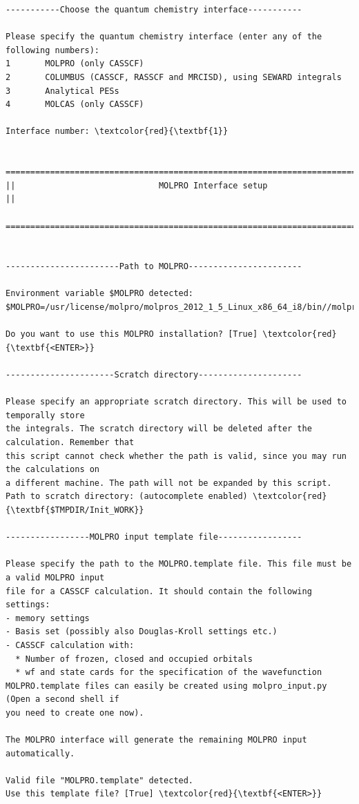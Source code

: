 \documentclass[a4paper,11pt,DIV=15,openany]{scrbook}
\begin{document}
\begin{oframed}
\begin{Verbatim}[commandchars=\\\{\}]
-----------Choose the quantum chemistry interface-----------

Please specify the quantum chemistry interface (enter any of the following numbers):
1       MOLPRO (only CASSCF)
2       COLUMBUS (CASSCF, RASSCF and MRCISD), using SEWARD integrals
3       Analytical PESs
4       MOLCAS (only CASSCF)

Interface number: \textcolor{red}{\textbf{1}}

  ================================================================================
||                             MOLPRO Interface setup                             ||
  ================================================================================


-----------------------Path to MOLPRO-----------------------

Environment variable $MOLPRO detected:
$MOLPRO=/usr/license/molpro/molpros_2012_1_5_Linux_x86_64_i8/bin//molpro

Do you want to use this MOLPRO installation? [True] \textcolor{red}{\textbf{<ENTER>}}

----------------------Scratch directory---------------------

Please specify an appropriate scratch directory. This will be used to temporally store
the integrals. The scratch directory will be deleted after the calculation. Remember that
this script cannot check whether the path is valid, since you may run the calculations on 
a different machine. The path will not be expanded by this script.
Path to scratch directory: (autocomplete enabled) \textcolor{red}{\textbf{$TMPDIR/Init_WORK}}

-----------------MOLPRO input template file-----------------

Please specify the path to the MOLPRO.template file. This file must be a valid MOLPRO input 
file for a CASSCF calculation. It should contain the following settings:
- memory settings
- Basis set (possibly also Douglas-Kroll settings etc.)
- CASSCF calculation with:
  * Number of frozen, closed and occupied orbitals
  * wf and state cards for the specification of the wavefunction
MOLPRO.template files can easily be created using molpro_input.py (Open a second shell if 
you need to create one now).

The MOLPRO interface will generate the remaining MOLPRO input automatically.

Valid file "MOLPRO.template" detected. 
Use this template file? [True] \textcolor{red}{\textbf{<ENTER>}}


\end{Verbatim}
\end{oframed}
\end{document}

